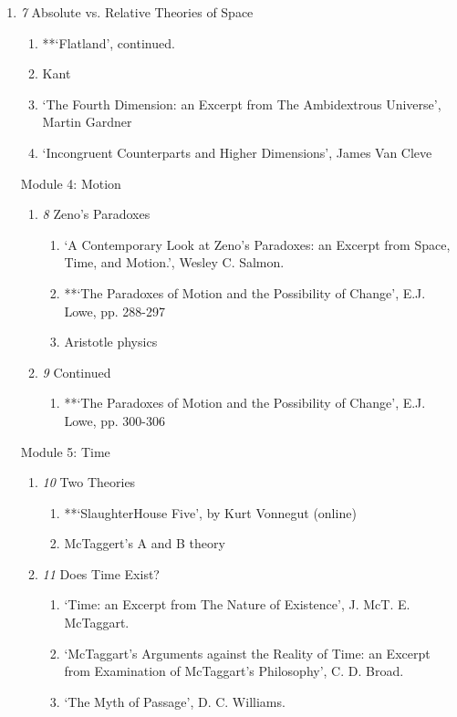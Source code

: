 \documentclass[article,oneside]{memoir}
\begin{document}
\begin{description}
\begin{enumerate}
\begin{enumerate}
\item \textit{7} Absolute vs. Relative Theories of Space
\begin{enumerate}
\item **`Flatland', continued.
\item Kant
\item `The Fourth Dimension: an Excerpt from The Ambidextrous Universe', Martin Gardner
\item `Incongruent Counterparts and Higher Dimensions', James Van Cleve
\end{enumerate}

\item[Module 4:] Motion
\begin{enumerate}
\item \textit{8} Zeno's Paradoxes
\begin{enumerate}
\item `A Contemporary Look at Zeno’s Paradoxes: an Excerpt from Space, Time, and Motion.', Wesley C. Salmon. 
\item **`The Paradoxes of Motion and the Possibility of Change', E.J. Lowe, pp. 288-297
\item Aristotle physics
\end{enumerate}
\item \textit{9} Continued
\begin{enumerate}
\item **`The Paradoxes of Motion and the Possibility of Change', E.J. Lowe, pp. 300-306
\end{enumerate}
\end{enumerate}

\item[Module 5:] Time
\begin{enumerate}
\item \textit{10} Two Theories
\begin{enumerate}
\item **`SlaughterHouse Five', by Kurt Vonnegut (online)
\item McTaggert's A and B theory
\end{enumerate}
\item  \textit{11} Does Time Exist?
\begin{enumerate}
\item `Time: an Excerpt from The Nature of Existence', J. McT. E. McTaggart.
\item `McTaggart’s Arguments against the Reality of Time: an Excerpt from Examination of McTaggart’s Philosophy', C. D. Broad.
\item `The Myth of Passage', D. C. Williams.
\end{enumerate}
\end{enumerate}


\end{enumerate}
\end{enumerate}
\end{description}
\end{document}
